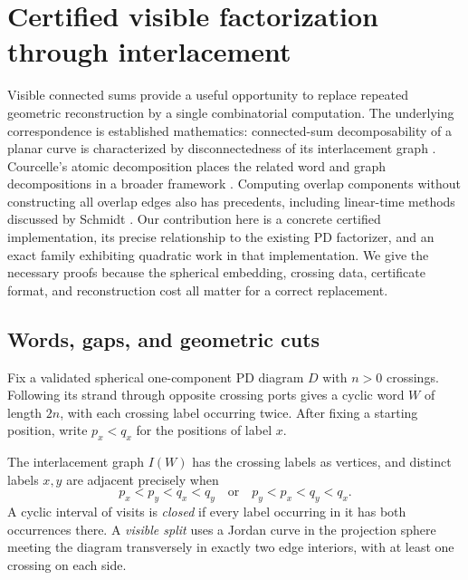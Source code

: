 \section{Certified visible factorization through interlacement}
\label{sec:factorization}

Visible connected sums provide a useful opportunity to replace repeated
geometric reconstruction by a single combinatorial computation.  The
underlying correspondence is established mathematics: connected-sum
decomposability of a planar curve is characterized by disconnectedness of
its interlacement graph \cite{khan2021}.  Courcelle's atomic decomposition
places the related word and graph decompositions in a broader framework
\cite[Definition~22 and Lemma~23]{courcelle}.  Computing overlap components
without constructing all overlap edges also has precedents, including
linear-time methods discussed by Schmidt \cite[Section~4.1 and Lemma~15]{schmidt}.
Our contribution here is a concrete certified implementation, its precise
relationship to the existing PD factorizer, and an exact family exhibiting
quadratic work in that implementation.  We give the necessary proofs because
the spherical embedding, crossing data, certificate format, and reconstruction
cost all matter for a correct replacement.

\subsection{Words, gaps, and geometric cuts}

Fix a validated spherical one-component PD diagram $D$ with $n>0$ crossings.
Following its strand through opposite crossing ports gives a cyclic word
$W$ of length $2n$, with each crossing label occurring twice.  After fixing
a starting position, write $p_x<q_x$ for the positions of label $x$.

\begin{definition}
The interlacement graph $I(W)$ has the crossing labels as vertices, and
distinct labels $x,y$ are adjacent precisely when
\begin{equation}
\label{eq:interlacement}
p_x<p_y<q_x<q_y
\quad\text{or}\quad
p_y<p_x<q_y<q_x.
\end{equation}
A cyclic interval of visits is \emph{closed} if every label occurring in it
has both occurrences there.  A \emph{visible split} uses a Jordan curve in
the projection sphere meeting the diagram transversely in exactly two edge
interiors, with at least one crossing on each side.
\end{definition}

